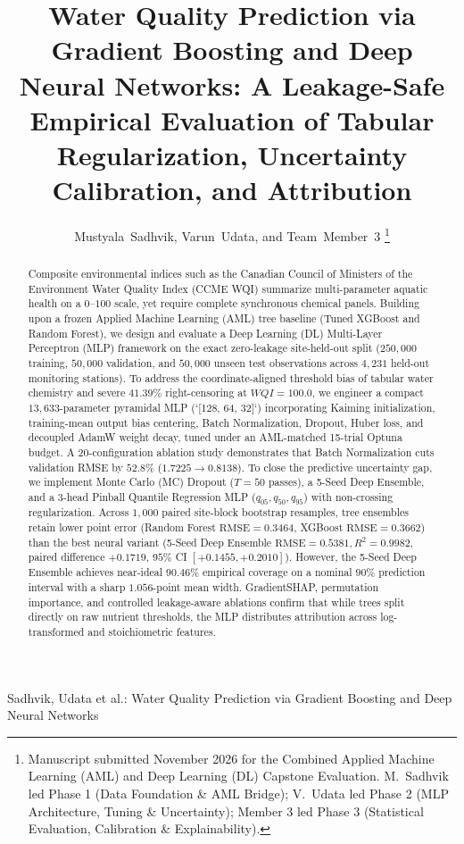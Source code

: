 \documentclass[journal,10pt,twocolumn]{IEEEtran}
\begin{document}
\title{Water Quality Prediction via Gradient Boosting and Deep Neural Networks: A Leakage-Safe Empirical Evaluation of Tabular Regularization, Uncertainty Calibration, and Attribution}

\author{Mustyala~Sadhvik, Varun~Udata, and Team~Member~3%
\thanks{Manuscript submitted November 2026 for the Combined Applied Machine Learning (AML) and Deep Learning (DL) Capstone Evaluation. M.~Sadhvik led Phase 1 (Data Foundation \& AML Bridge); V.~Udata led Phase 2 (MLP Architecture, Tuning \& Uncertainty); Member 3 led Phase 3 (Statistical Evaluation, Calibration \& Explainability).}}

%
{Sadhvik, Udata et al.: Water Quality Prediction via Gradient Boosting and Deep Neural Networks}

\maketitle

\begin{abstract}
Composite environmental indices such as the Canadian Council of Ministers of the Environment Water Quality Index (CCME WQI) summarize multi-parameter aquatic health on a $0\text{--}100$ scale, yet require complete synchronous chemical panels. Building upon a frozen Applied Machine Learning (AML) tree baseline (Tuned XGBoost and Random Forest), we design and evaluate a Deep Learning (DL) Multi-Layer Perceptron (MLP) framework on the exact zero-leakage site-held-out split ($250,000$ training, $50,000$ validation, and $50,000$ unseen test observations across $4,231$ held-out monitoring stations). To address the coordinate-aligned threshold bias of tabular water chemistry and severe $41.39\%$ right-censoring at $WQI = 100.0$, we engineer a compact $13,633$-parameter pyramidal MLP (`[128, 64, 32]`) incorporating Kaiming initialization, training-mean output bias centering, Batch Normalization, Dropout, Huber loss, and decoupled AdamW weight decay, tuned under an AML-matched 15-trial Optuna budget. A 20-configuration ablation study demonstrates that Batch Normalization cuts validation RMSE by $52.8\%$ ($1.7225 \to 0.8138$). To close the predictive uncertainty gap, we implement Monte Carlo (MC) Dropout ($T=50$ passes), a 5-Seed Deep Ensemble, and a 3-head Pinball Quantile Regression MLP ($q_{05}, q_{50}, q_{95}$) with non-crossing regularization. Across $1,000$ paired site-block bootstrap resamples, tree ensembles retain lower point error (Random Forest $\text{RMSE} = 0.3464$, XGBoost $\text{RMSE} = 0.3662$) than the best neural variant (5-Seed Deep Ensemble $\text{RMSE} = 0.5381, R^2 = 0.9982$, paired difference $+0.1719$, $95\%$ CI $[+0.1455, +0.2010]$). However, the 5-Seed Deep Ensemble achieves near-ideal $90.46\%$ empirical coverage on a nominal $90\%$ prediction interval with a sharp $1.056$-point mean width. GradientSHAP, permutation importance, and controlled leakage-aware ablations confirm that while trees split directly on raw nutrient thresholds, the MLP distributes attribution across log-transformed and stoichiometric features.
\end{abstract}
\end{document}
